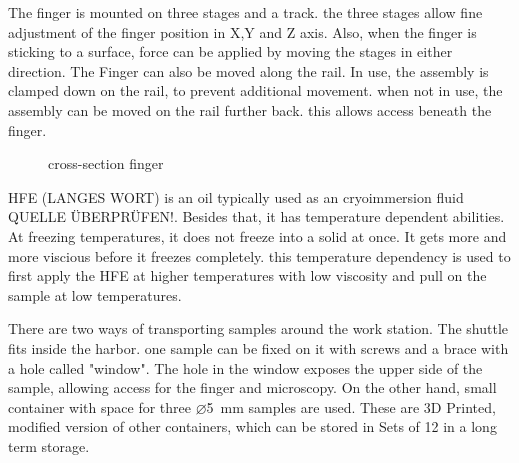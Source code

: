 The finger is  mounted on three stages and a track. the three stages allow fine adjustment of the finger position in X,Y and Z axis. Also, when the finger is sticking to a surface, force can be applied by moving the stages in either direction. The Finger can also be moved along the rail. In use, the assembly is clamped down on the rail, to prevent additional movement. when not in use, the assembly can be moved on the rail further back. this allows access beneath the finger.

\begin{figure}[hbt!]
	\centering
	
	\caption{cross-section finger}
	\label{fig:querschnittfinger}
\end{figure}

\begin{comment}
	\begin{figure}[hbt!]
		\centering
		\begin{overpic}[height=7cm]{TempFinger}%
			\thicklines
			\put(42,15){\vector(-1,0){10}}
			\put(42,15){\makebox(0,0)[lb]{ Heater,}}
			\put(42,15){\makebox(0,0)[lt]{ Temperature sensor}}
			\put(3,50){\vector(1,0){20}}
			\put(3,50){\makebox(0,0)[r]{Steel Rod }}
			\put(5,96){\vector(1,-1){10}}
			\put(5,96){\makebox(0,0)[r]{Gas inlet }}
			\put(48,96){\vector(-1,-1){10}}
			\put(48,96){\makebox(0,0)[l]{ Gas outlet}}
			\put(17,0){\vector(2,1){10}}
			\put(17,0){\makebox(0,0)[r]{Tip }}
		\end{overpic}
		\caption{Querschnitt finger}
		\label{fig:querschnittfinger}
	\end{figure}
\end{comment}



HFE (LANGES WORT) is an oil typically used as an cryoimmersion fluid \cite{Faoro.2018b}QUELLE ÜBERPRÜFEN!. Besides that, it has temperature dependent abilities. At freezing temperatures, it does not freeze into a solid at once. It gets more and more viscious before it freezes completely. this temperature dependency is used to first apply the HFE at higher temperatures with low viscosity and pull on the sample at low temperatures.

There are two ways of transporting samples around the work station. The shuttle fits inside the harbor. one sample can be fixed on it with screws and a brace with a hole called "window". The hole in the window exposes the upper side of the sample, allowing access for the finger and microscopy. On the other hand, small container with space for three $\varnothing$\SI{5}{\milli\meter} samples are used. These are 3D Printed, modified version of other containers, which can be stored in Sets of 12 in a long term storage.


